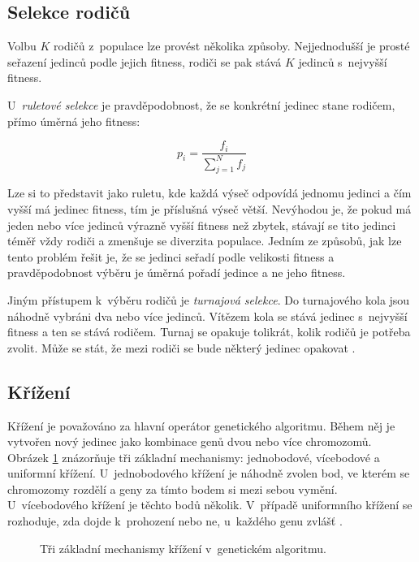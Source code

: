 \subsection{Selekce rodičů}

Volbu $K$ rodičů z~populace lze provést několika způsoby. Nejjednodušší je prosté seřazení jedinců podle jejich fitness, rodiči se pak stává $K$ jedinců s~nejvyšší fitness.

U~\emph{ruletové selekce} je pravděpodobnost, že se konkrétní jedinec stane rodičem, přímo úměrná jeho fitness:

\begin{equation*}
p_i = \frac{f_i}{\sum_{j=1}^N{f_j}}
\end{equation*}

\noindent{}Lze si to představit jako ruletu, kde každá výseč odpovídá jednomu jedinci a čím vyšší má jedinec fitness, tím je příslušná výseč větší. Nevýhodou je, že pokud má jeden nebo více jedinců výrazně vyšší fitness než zbytek, stávají se tito jedinci téměř vždy rodiči a zmenšuje se diverzita populace. Jedním ze způsobů, jak lze tento problém řešit je, že se jedinci seřadí podle velikosti fitness a pravděpodobnost výběru je úměrná pořadí jedince a ne jeho fitness.

Jiným přístupem k~výběru rodičů je \emph{turnajová selekce}. Do turnajového kola jsou náhodně vybráni dva nebo více jedinců. Vítězem kola se stává jedinec s~nejvyšší fitness a ten se stává rodičem. Turnaj se opakuje tolikrát, kolik rodičů je potřeba zvolit. Může se stát, že mezi rodiči se bude některý jedinec opakovat \cite{Modra}.



\subsection{Křížení}

Křížení je považováno za hlavní operátor genetického algoritmu. Během něj je vytvořen nový jedinec jako kombinace genů dvou nebo více chromozomů. Obrázek \ref{obrKrizeni} znázorňuje tři základní mechanismy: jednobodové, vícebodové a uniformní křížení. U~jednobodového křížení je náhodně zvolen bod, ve kterém se chromozomy rozdělí a geny za tímto bodem si mezi sebou vymění. U~vícebodového křížení je těchto bodů několik. V~případě uniformního křížení se rozhoduje, zda dojde k~prohození nebo ne, u~každého genu zvlášť \cite{Modra}.

\begin{figure}[htb]
    \centering
    \caption{Tři základní mechanismy křížení v~genetickém algoritmu.}
    \label{obrKrizeni}
\end{figure}


